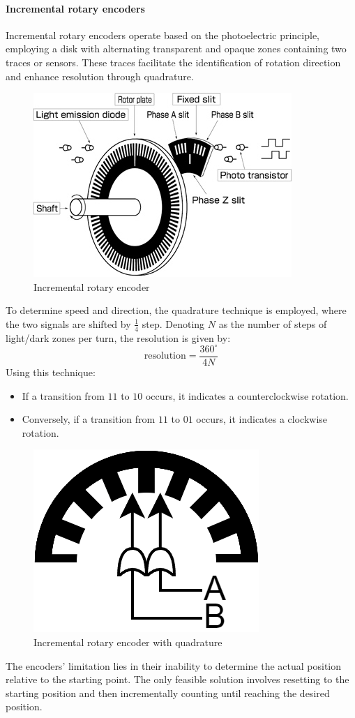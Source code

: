 \paragraph*{Incremental rotary encoders}
Incremental rotary encoders operate based on the photoelectric principle, employing a disk with alternating transparent and opaque zones containing two traces or sensors.
These traces facilitate the identification of rotation direction and enhance resolution through quadrature.
\begin{figure}[H]
    \centering
    \includegraphics[width=0.35\linewidth]{images/rotary1.png}
    \caption{Incremental rotary encoder}
\end{figure}
To determine speed and direction, the quadrature technique is employed, where the two signals are shifted by $\frac{1}{4}$ step. 
Denoting $N$ as the number of steps of light/dark zones per turn, the resolution is given by:
\[\text{resolution}=\dfrac{360^{\circ}}{4N}\]
Using this technique:
\begin{itemize}
    \item If a transition from $1 1$ to $1 0$ occurs, it indicates a counterclockwise rotation.
    \item Conversely, if a transition from $1 1$ to $0 1$ occurs, it indicates a clockwise rotation.
\end{itemize}

\begin{figure}[H]
    \centering
    \includegraphics[width=0.25\linewidth]{images/rotary.png}
    \caption{Incremental rotary encoder with quadrature}
\end{figure}
The encoders' limitation lies in their inability to determine the actual position relative to the starting point.
The only feasible solution involves resetting to the starting position and then incrementally counting until reaching the desired position.

